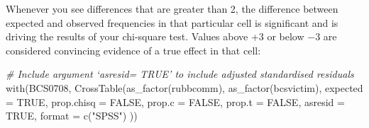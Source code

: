 \documentclass[
]{book}
\newenvironment{Shaded}{\begin{snugshade}}{\end{snugshade}}
\newcommand{\AttributeTok}[1]{\textcolor[rgb]{0.77,0.63,0.00}{#1}}
\newcommand{\CommentTok}[1]{\textcolor[rgb]{0.56,0.35,0.01}{\textit{#1}}}
\newcommand{\ConstantTok}[1]{\textcolor[rgb]{0.00,0.00,0.00}{#1}}
\newcommand{\FunctionTok}[1]{\textcolor[rgb]{0.00,0.00,0.00}{#1}}
\newcommand{\NormalTok}[1]{#1}
\newcommand{\StringTok}[1]{\textcolor[rgb]{0.31,0.60,0.02}{#1}}
\begin{document}
Whenever you see differences that are greater than 2, the difference between expected and observed frequencies in that particular cell is significant and is driving the results of your chi-square test. Values above +3 or below −3 are considered convincing evidence of a true effect in that cell:

\begin{Shaded}
\begin{Highlighting}[]
\CommentTok{\# Include argument ‘asresid= TRUE’ to include adjusted standardised residuals}
\FunctionTok{with}\NormalTok{(BCS0708, }\FunctionTok{CrossTable}\NormalTok{(}\FunctionTok{as\_factor}\NormalTok{(rubbcomm), }\FunctionTok{as\_factor}\NormalTok{(bcsvictim), }\AttributeTok{expected =} \ConstantTok{TRUE}\NormalTok{,}
                         \AttributeTok{prop.chisq =} \ConstantTok{FALSE}\NormalTok{, }\AttributeTok{prop.c =} \ConstantTok{FALSE}\NormalTok{, }\AttributeTok{prop.t =} \ConstantTok{FALSE}\NormalTok{, }\AttributeTok{asresid =}
                           \ConstantTok{TRUE}\NormalTok{, }\AttributeTok{format =} \FunctionTok{c}\NormalTok{(}\StringTok{"SPSS"}\NormalTok{) ))}
\end{Highlighting}
\end{Shaded}
\end{document}
